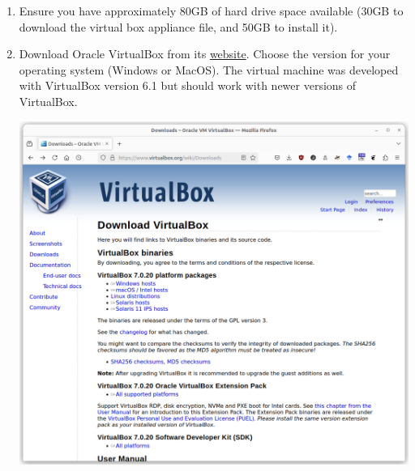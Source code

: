 \begin{enumerate}
\item Ensure you have approximately 80GB of hard drive space available (30GB to download the virtual box appliance file, and 50GB to install it).
\item Download Oracle VirtualBox from its \href{https://www.virtualbox.org/wiki/Downloads}{website}. Choose the version for your operating system (Windows or MacOS). The virtual machine was developed with VirtualBox version 6.1 but should work with newer versions of VirtualBox. 

\begin{center}
\includegraphics[width=.5\textwidth]{screen2.png}
\end{center}


\end{enumerate}
